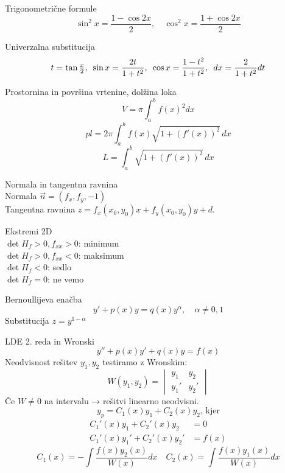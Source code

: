 \documentclass[a4paper,10pt]{article}
\begin{document}
\begin{multicols}{2}
\begin{formulaBox}{Trigonometrične formule}
\[
\sin^2 x = \frac{1-\cos 2x}{2},\quad \cos^2 x = \frac{1+\cos 2x}{2}
\]
\end{formulaBox}

\begin{formulaBox}{Univerzalna substitucija}
\[t=\tan \tfrac{x}{2},\hspace{0.5em}
\sin x = \frac{2t}{1+t^2},\hspace{0.5em}
\cos x = \frac{1-t^2}{1+t^2},\hspace{0.5em}
dx=\frac{2}{1+t^2}dt
\]
\end{formulaBox}

\begin{formulaBox}{Prostornina in površina vrtenine, dolžina loka}
\[
V = \pi\int_a^b f(x)^2 dx\]
\[
pl = 2\pi\int_a^b f(x)\sqrt{1+(f'(x))^2}\,dx
\]
\[L=\int_a^b \sqrt{1+(f'(x))^2}\,dx\]
\end{formulaBox}

\begin{formulaBox}{Normala in tangentna ravnina}
	\\
Normala $\vec{n}=(f_x,f_y,-1)$\\
Tangentna ravnina $z=f_x(x_0,y_0)x+f_y(x_0,y_0)y+d$.
\end{formulaBox}

\begin{formulaBox}{Ekstremi 2D}
	\\
$\det H_f>0, f_{xx}>0$: minimum\\
$\det H_f>0, f_{xx}<0$: maksimum\\
$\det H_f<0$: sedlo\\
$\det H_f=0$: ne vemo
\end{formulaBox}

\begin{formulaBox}{Bernoullijeva enačba}
\[
y' + p(x)y = q(x)y^\alpha,\quad \alpha\ne 0,1
\]
Substitucija $z = y^{1-\alpha}$
\end{formulaBox}

\begin{formulaBox}{LDE 2. reda in Wronski}
\[
y'' + p(x)y' + q(x)y = f(x)
\]
Neodvisnost rešitev $y_1,y_2$ testiramo z Wronskim:
\[
W(y_1,y_2) = 
\begin{vmatrix}
y_1 & y_2 \\[4pt]
y_1' & y_2'
\end{vmatrix}
\]
Če $W\neq 0$ na intervalu → rešitvi linearno neodvisni.
\[y_p = C_1(x)y_1+C_2(x)y_2,\, \text{kjer}\]
\begin{align*}
C_1'(x)y_1+C_2'(x)y_2&=0  \\
C_1'(x)y_1'+C_2'(x)y_2'&=f(x)
\end{align*}
\[C_1(x)=-\int\frac{f(x)y_2(x)}{W(x)}dx\quad C_2(x)=\int\frac{f(x)y_1(x)}{W(x)}dx\]
\end{formulaBox}


\end{multicols}
\end{document}
